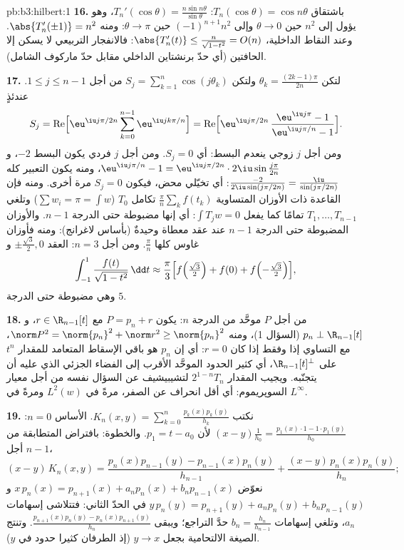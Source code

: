 \begin{solution}{pb:b3:hilbert:1}
\textbf{16.} باشتقاق $T_n(\cos\theta) = \cos
n\theta$: $T_n'(\cos\theta) = \frac{n\sin n\theta}
{\sin\theta}$، وهو يؤول إلى $n^2$ حين
$\theta \to 0$ وإلى $(-1)^{n+1}n^2$ حين $\theta \to \pi$: ومنه
$\abs{T_n'(\pm1)} =
n^2$. وعند النقاط الداخلية، $\abs{T_n'(t)} \leq
\frac{n}{\sqrt{1 - t^2}} = O(n)$: فالانفجار التربيعي لا
يسكن إلا الحافتين (أي حدّ برنشتاين الداخلي مقابل حدّ ماركوف
الشامل).

\textbf{17.} لتكن $\theta_k = \frac{(2k-1)\pi}{2n}$ ولتكن $S_j
= \sum_{k=1}^n\cos(j\theta_k)$ من أجل $1 \leq j \leq n-1$. عندئذٍ
\[
S_j = \operatorname{Re}\Bigl[\eu^{\iu j\pi/2n}
\sum_{k=0}^{n-1}\eu^{\iu jk\pi/n}\Bigr]
= \operatorname{Re}\Bigl[\eu^{\iu j\pi/2n}\,
\frac{\eu^{\iu j\pi} - 1}{\eu^{\iu j\pi/n} - 1}\Bigr] .
\]
ومن أجل $j$ زوجي ينعدم البسط: أي $S_j = 0$. ومن أجل $j$ فردي
يكون البسط $-2$، و $\eu^{\iu j\pi/n} - 1 =
\eu^{\iu j\pi/2n}\cdot2\iu\sin\frac{j\pi}{2n}$، ومنه يكون التعبير كله $\frac{-2}{2\iu\sin(j\pi/2n)} =
\frac{\iu}{\sin(j\pi/2n)}$: أي
تخيّلي محض، فيكون $S_j = 0$ مرة أخرى. ومنه فإن القاعدة ذات
الأوزان المتساوية $\frac\pi n\sum_kf(t_k)$ تكامل $T_0$ ($\sum w_i = \pi = \int w$) وتلغي $T_1,
\dots, T_{n-1}$
تمامًا كما يفعل $\int T_jw = 0$: أي إنها مضبوطة حتى الدرجة
$n - 1$. والأوزان المضبوطة حتى الدرجة $n-1$ عند عقد معطاة
وحيدةٌ (بأساس لاغرانج): ومنه فأوزان غاوس كلها $\frac\pi n$.
ومن أجل $n = 3$: العقد $\pm\frac{\sqrt3}2, 0$ و
\[
\int_{-1}^1\frac{f(t)}{\sqrt{1 - t^2}}\,\dd t \approx
\frac\pi3\Bigl[f\Bigl(\tfrac{\sqrt3}2\Bigr) + f(0) +
f\Bigl(-\tfrac{\sqrt3}2\Bigr)\Bigr],
\]
وهي مضبوطة حتى الدرجة $5$.

\textbf{18.} من أجل $P$ موحَّد من الدرجة $n$: يكون
$P = p_n + r$ مع $r \in \R_{n-1}[t]$، و $p_n \perp \R_{n-1}[t]$ (السؤال 1)، ومنه $\norm P^2 = \norm{p_n}^2 + \norm r^2 \geq
\norm{p_n}^2$،
مع التساوي إذا وفقط إذا كان $r = 0$: أي إن $p_n$ هو باقي
الإسقاط المتعامد للمقدار $t^n$ على $\R_{n-1}[t]^\perp$، أي كثير الحدود
الموحَّد الأقرب إلى الفضاء الجزئي الذي عليه أن يتجنّبه. ويجيب
المقدار $2^{1-n}T_n$ لتشيبيشيف عن السؤال نفسه من أجل معيار
السوپريموم: أي أقل انحراف عن الصفر، مرةً في $L^2(w)$ ومرةً في
$L^\infty$.

\textbf{19.} نكتب $K_n(x, y) =
\sum_{k=0}^n\frac{p_k(x)p_k(y)}{h_k}$. الأساس $n = 0$: $(x -
y)\frac1{h_0} = \frac{p_1(x)\cdot1 - 1\cdot p_1(y)}{h_0}$ لأن
$p_1 = t - a_0$. والخطوة: بافتراض المتطابقة من أجل $n -
1$،
\[
(x - y)\,K_n(x,y) = \frac{p_n(x)p_{n-1}(y) -
p_{n-1}(x)p_n(y)}{h_{n-1}} +
\frac{(x - y)\,p_n(x)p_n(y)}{h_n} ;
\]
نعوّض $x\,p_n(x) = p_{n+1}(x) + a_np_n(x) +
b_np_{n-1}(x)$ و $y\,p_n(y) = p_{n+1}(y) + a_np_n(y) +
b_np_{n-1}(y)$ في الحدّ الثاني: فتتلاشى إسهامات $a_n$،
وتلغي إسهامات $b_n = \frac{h_n}{h_{n-1}}$ حدَّ التراجع؛ ويبقى $\frac{p_{n+1}(x)p_n(y) - p_n(x)p_{n+1}(y)}{h_n}$. وتنتج
الصيغة الالتحامية بجعل $y \to x$ (إذ الطرفان كثيرا حدود في
$y$).


\end{solution}
